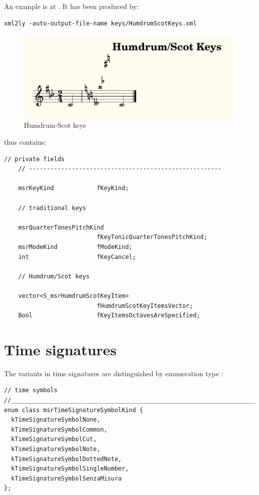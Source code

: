 An example is at . It has been produced by:
\begin{lstlisting}[language=Terminal]
xml2ly -auto-output-file-name keys/HumdrumScotKeys.xml
\end{lstlisting}

\begin{figure}[htbp]
\begin{center}
\includegraphics{../graphics/HumdrumScotKeys.png}

\caption{Humdrum-Scot keys}
\label{Humdrum-Scot keys}
\end{center}
\end{figure}

 thus contains:
\begin{lstlisting}[language=CPlusPlus]
    // private fields
    // ------------------------------------------------------

    msrKeyKind            fKeyKind;

    // traditional keys

    msrQuarterTonesPitchKind
                          fKeyTonicQuarterTonesPitchKind;
    msrModeKind           fModeKind;
    int                   fKeyCancel;

    // Humdrum/Scot keys

    vector<S_msrHumdrumScotKeyItem>
                          fHumdrumScotKeyItemsVector;
    Bool                  fKeyItemsOctavesAreSpecified;
\end{lstlisting}


\section{Time signatures}\label{Time signatures}

The variants in time signatures are distinguished by enumeration type :
\begin{lstlisting}[language=CPlusPlus]
// time symbols
//______________________________________________________________________________
enum class msrTimeSignatureSymbolKind {
  kTimeSignatureSymbolNone,
  kTimeSignatureSymbolCommon,
  kTimeSignatureSymbolCut,
  kTimeSignatureSymbolNote,
  kTimeSignatureSymbolDottedNote,
  kTimeSignatureSymbolSingleNumber,
  kTimeSignatureSymbolSenzaMisura
};
\end{lstlisting}

